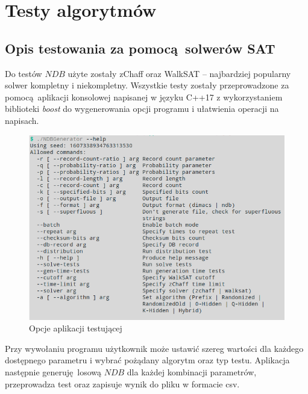 \chapter{Testy algorytmów}
\section{Opis testowania za pomocą solwerów SAT}


Do testów $NDB$ użyte zostały zChaff oraz WalkSAT -- najbardziej popularny solwer kompletny i niekompletny.
Wszystkie testy zostały przeprowadzone za pomocą aplikacji konsolowej napisanej w języku C++17 z wykorzystaniem
biblioteki \textit{boost} do wygenerowania opcji programu i ułatwienia operacji na napisach.

\begin{figure}[h]
    \includegraphics[width=15cm]{img/NDBGeneratorHelp.png}
    \centering
    \caption{Opcje aplikacji testującej}
    \label{img:NDBGenHelp}
\end{figure}

Przy wywołaniu programu użytkownik może ustawić szereg wartości dla każdego dostępnego parametru i wybrać pożądany algorytm oraz typ testu.
Aplikacja następnie generuję losową $NDB$ dla każdej kombinacji parametrów, przeprowadza test oraz zapisuje wynik do pliku w formacie csv.

